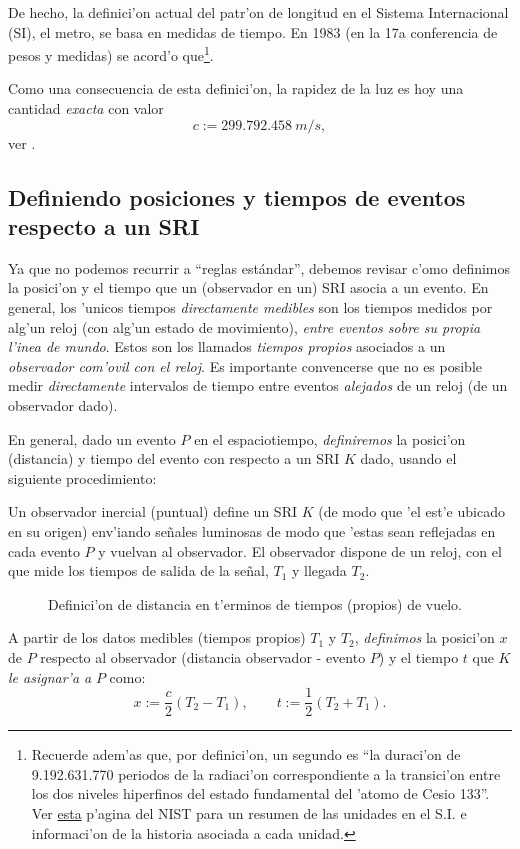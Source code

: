 De hecho, la definici'on actual del patr'on de longitud en el Sistema
Internacional (SI), el metro, se basa en medidas de tiempo. En 1983 (en la 17a
conferencia de pesos y medidas) se acord'o que\footnote{Recuerde adem'as que, por definici'on, un segundo es ``la duraci'on de 9.192.631.770 periodos de la radiaci'on correspondiente a la transici'on entre los dos niveles hiperfinos del estado fundamental del 'atomo de Cesio 133''. Ver \href{http://physics.nist.gov/cuu/Units/current.html}{esta} p'agina del NIST para un resumen de las unidades en el S.I. e informaci'on de la historia asociada a cada unidad.}.
\begin{quotation}
\end{quotation}
Como una consecuencia de esta definici'on, la rapidez de la luz es hoy una
cantidad \textit{exacta} con valor
\begin{equation}
\boxed{c:=299.792.458\ m/s,}
\end{equation}
ver \cite{CODATA00}.

\subsection{Definiendo posiciones y tiempos de eventos respecto a un SRI}

Ya que no podemos recurrir a ``reglas est\'andar'', debemos revisar c'omo definimos la posici'on y el tiempo que un (observador en un) SRI asocia a un evento. En general, los 'unicos tiempos \textit{directamente medibles} son los tiempos medidos por alg'un reloj (con alg'un estado de movimiento), \textit{entre eventos sobre su propia l'inea de mundo}. Estos son los llamados \textit{tiempos propios} asociados a un \textit{observador com'ovil con el reloj}. Es importante convencerse que no es posible medir \textit{directamente} intervalos de tiempo entre eventos \textit{alejados} de un reloj (de un observador dado).

En general, dado un evento $P$ en el espaciotiempo, \textit{definiremos} la posici'on (distancia) y tiempo del evento con respecto a un SRI $K$ dado, usando el siguiente procedimiento:

Un observador inercial (puntual) define un SRI $K$ (de modo que 'el est'e  ubicado en su origen) env'iando se\~nales luminosas de modo que 'estas sean reflejadas en cada evento $P$ y vuelvan al observador. El observador dispone de un reloj,  con el que mide los tiempos de salida de la se\~nal, $T_1$
y llegada $T_2$.
\begin{figure}[!h]
\centerline{}
 \caption{Definici'on de distancia en t'erminos de tiempos (propios) de vuelo.}
\label{defdist}
\end{figure}
A partir de los datos medibles (tiempos propios) $T_1$ y $T_2$, \textit{definimos} la posici'on
$x$ de $P$ respecto al observador (distancia observador - evento $P$) y el
tiempo $t$ que $K$ \textit{le asignar'a a} $P$ como:
\begin{equation}\label{defxt}
\boxed{x:=\frac{c}{2}(T_2-T_1), \qquad t:=\frac{1}{2}(T_2+T_1).}
\end{equation}

